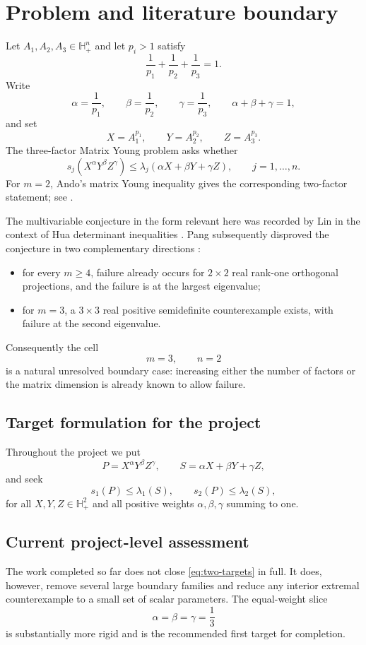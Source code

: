 \section{Problem and literature boundary}

Let $A_1,A_2,A_3\in\mathbb H_+^n$ and let $p_i>1$ satisfy
\[
\frac1{p_1}+\frac1{p_2}+\frac1{p_3}=1.
\]
Write
\[
\alpha=\frac1{p_1},\qquad \beta=\frac1{p_2},\qquad \gamma=\frac1{p_3},
\qquad \alpha+\beta+\gamma=1,
\]
and set
\[
X=A_1^{p_1},\qquad Y=A_2^{p_2},\qquad Z=A_3^{p_3}.
\]
The three-factor Matrix Young problem asks whether
\begin{equation}
 s_j\!\left(X^\alpha Y^\beta Z^\gamma\right)
 \le
 \lambda_j\!\left(\alpha X+\beta Y+\gamma Z\right),
 \qquad j=1,\dots,n.
 \label{eq:MY}
\end{equation}
For $m=2$, Ando's matrix Young inequality gives the corresponding two-factor statement; see \cite{Ando1995}.

The multivariable conjecture in the form relevant here was recorded by Lin in the context of Hua determinant inequalities \cite{Lin2024}.  Pang subsequently disproved the conjecture in two complementary directions \cite{Pang2026}:
\begin{itemize}[leftmargin=2em]
\item for every $m\ge4$, failure already occurs for $2\times2$ real rank-one orthogonal projections, and the failure is at the largest eigenvalue;
\item for $m=3$, a $3\times3$ real positive semidefinite counterexample exists, with failure at the second eigenvalue.
\end{itemize}
Consequently the cell
\[
\boxed{m=3,\qquad n=2}
\]
is a natural unresolved boundary case: increasing either the number of factors or the matrix dimension is already known to allow failure.

\subsection{Target formulation for the project}
Throughout the project we put
\[
P=X^\alpha Y^\beta Z^\gamma,
\qquad
S=\alpha X+\beta Y+\gamma Z,
\]
and seek
\begin{equation}
 s_1(P)\le\lambda_1(S),
 \qquad
 s_2(P)\le\lambda_2(S),
 \label{eq:two-targets}
\end{equation}
for all $X,Y,Z\in\mathbb H_+^2$ and all positive weights $\alpha,\beta,\gamma$ summing to one.

\subsection{Current project-level assessment}
The work completed so far does not close \eqref{eq:two-targets} in full.  It does, however, remove several large boundary families and reduce any interior extremal counterexample to a small set of scalar parameters.  The equal-weight slice
\[
\alpha=\beta=\gamma=\frac13
\]
is substantially more rigid and is the recommended first target for completion.
